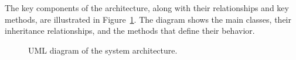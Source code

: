 The key components of the architecture, along with their relationships and key methods, are illustrated in Figure~\ref{fig:uml_diagram}.
The diagram shows the main classes, their inheritance relationships, and the methods that define their behavior.

\begin{figure}[ht]
    \centering
    
    \caption{UML diagram of the system architecture.}
    \label{fig:uml_diagram}
\end{figure}